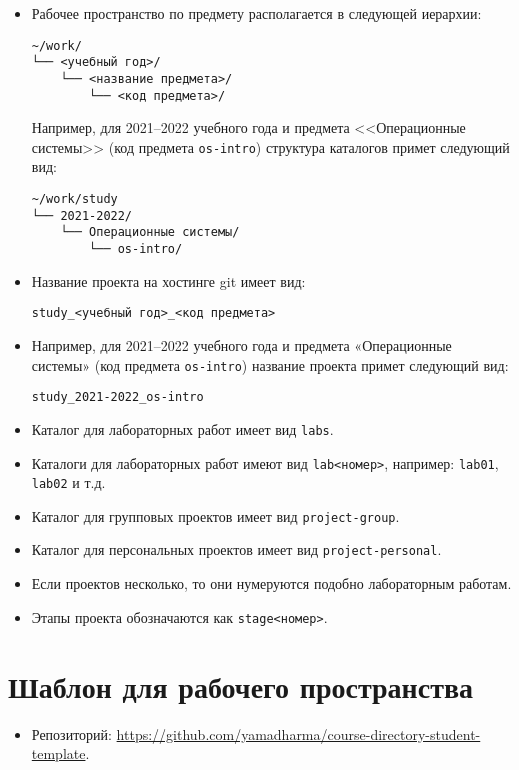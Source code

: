 \begin{itemize}
\item Рабочее пространство по предмету располагается в следующей иерархии:

\begin{verbatim}
~/work/
└── <учебный год>/
    └── <название предмета>/
        └── <код предмета>/
\end{verbatim}

Например, для 2021--2022 учебного года и предмета <<Операционные
системы>> (код предмета \texttt{os-intro}) структура каталогов примет следующий вид:

\begin{verbatim}
~/work/study
└── 2021-2022/
    └── Операционные системы/
        └── os-intro/
\end{verbatim}

\item Название проекта на хостинге git имеет вид:
\begin{verbatim}
study_<учебный год>_<код предмета>
\end{verbatim}
\item Например, для 2021--2022 учебного года и предмета «Операционные системы» (код предмета \texttt{os-intro}) название проекта примет следующий вид:
\begin{verbatim}
study_2021-2022_os-intro
\end{verbatim}


\item Каталог для лабораторных работ имеет вид \texttt{labs}.
\item Каталоги для лабораторных работ имеют вид \texttt{lab<номер>}, например: \texttt{lab01}, \texttt{lab02} и т.д.
\item Каталог для групповых проектов имеет вид \texttt{project-group}.
\item Каталог для персональных проектов имеет вид \texttt{project-personal}.
\item Если проектов несколько, то они нумеруются подобно лабораторным работам.
\item Этапы проекта обозначаются как \texttt{stage<номер>}.
\end{itemize}

\section{Шаблон для рабочего пространства}
\label{sec:method:template}

\begin{itemize}
\item Репозиторий: \url{https://github.com/yamadharma/course-directory-student-template}.
\end{itemize}

